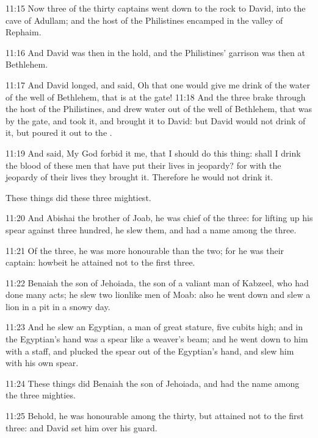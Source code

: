 11:15 Now three of the thirty captains went down to the rock to David, into the cave of Adullam; and the host of the Philistines encamped in the valley of Rephaim.

11:16 And David was then in the hold, and the Philistines' garrison was then at Bethlehem.

11:17 And David longed, and said, Oh that one would give me drink of the water of the well of Bethlehem, that is at the gate!  11:18 And the three brake through the host of the Philistines, and drew water out of the well of Bethlehem, that was by the gate, and took it, and brought it to David: but David would not drink of it, but poured it out to the \LORD.

11:19 And said, My God forbid it me, that I should do this thing: shall I drink the blood of these men that have put their lives in jeopardy? for with the jeopardy of their lives they brought it.  Therefore he would not drink it.

These things did these three mightiest.

11:20 And Abishai the brother of Joab, he was chief of the three: for lifting up his spear against three hundred, he slew them, and had a name among the three.

11:21 Of the three, he was more honourable than the two; for he was their captain: howbeit he attained not to the first three.

11:22 Benaiah the son of Jehoiada, the son of a valiant man of Kabzeel, who had done many acts; he slew two lionlike men of Moab: also he went down and slew a lion in a pit in a snowy day.

11:23 And he slew an Egyptian, a man of great stature, five cubits high; and in the Egyptian's hand was a spear like a weaver's beam; and he went down to him with a staff, and plucked the spear out of the Egyptian's hand, and slew him with his own spear.

11:24 These things did Benaiah the son of Jehoiada, and had the name among the three mighties.

11:25 Behold, he was honourable among the thirty, but attained not to the first three: and David set him over his guard.

